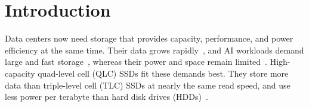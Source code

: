 \section{Introduction}
\label{sec:intro}
Data centers now need storage that provides capacity, performance, and power efficiency at the same time.
Their data grows rapidly~\cite{idc-dataage}, and AI workloads demand large and fast storage~\cite{dsi,solidigm-122tb}, whereas their power and space remain limited~\cite{dsi,meta-qlc,solidigm-122tb}.
High-capacity quad-level cell (QLC) SSDs fit these demands best. They store more data than triple-level cell (TLC) SSDs at nearly the same read speed, and use less power per terabyte than hard disk drives (HDDs)~\cite{meta-qlc,solidigm-122tb}.

